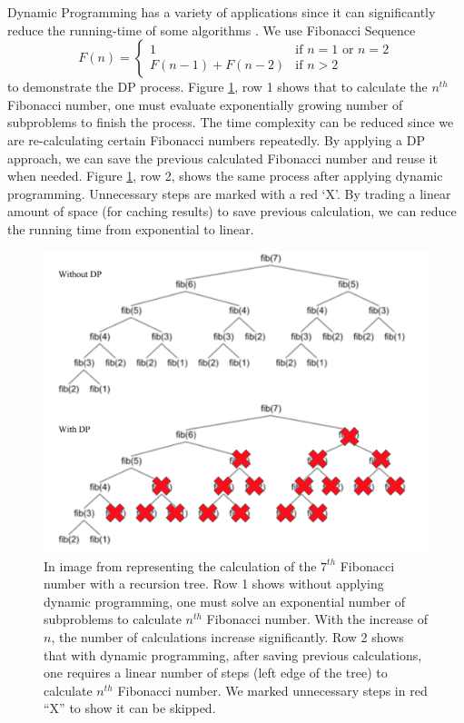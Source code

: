 Dynamic Programming has a variety of applications since it can significantly reduce the 
running-time of some algorithms \cite{bertsekas1995neuro}. 
We use Fibonacci Sequence 
$$F(n) = \begin{cases}
1 & \text{if $n=1$ or $n=2$}\\
F(n-1)+F(n-2) & \text{if $n>2$}
\end{cases}$$
to demonstrate the \ac{DP} process\cite{horadam1961generalized}. 
Figure \ref{fig:fbs}, row 1 shows that to calculate the $n^{th}$ Fibonacci number, one must 
evaluate exponentially growing number of subproblems to finish the process.
The time complexity can be reduced since we are re-calculating certain Fibonacci numbers repeatedly. 
By applying a \ac{DP} approach, we can save the previous calculated Fibonacci number and reuse it when needed.
Figure \ref{fig:fbs}, row 2, shows the same process after applying dynamic programming. Unnecessary steps are marked with a red `X'. 
By trading a linear amount of space (for caching results) to save previous calculation, we can reduce the running time from exponential to linear.

\begin{figure}[H]
\centering
\includegraphics[width=\textwidth]{Figures/treewithdp.png}
\caption[Demonstration on Fibonacci Sequence]{
In image from \cite{stack_overflow} representing the calculation of the $7^{th}$ Fibonacci number with a recursion tree. 
Row 1 shows without applying dynamic programming, one must solve an exponential number of subproblems to calculate $n^{th}$ Fibonacci number. 
With the increase of $n$, the number of calculations increase significantly.
Row 2 shows that with dynamic programming, after saving previous calculations, 
one requires a linear number of steps (left edge of the tree) 
to calculate $n^{th}$ Fibonacci number.
We marked unnecessary steps in red ``X'' to show it can be skipped. }

\label{fig:fbs}
\end{figure}


